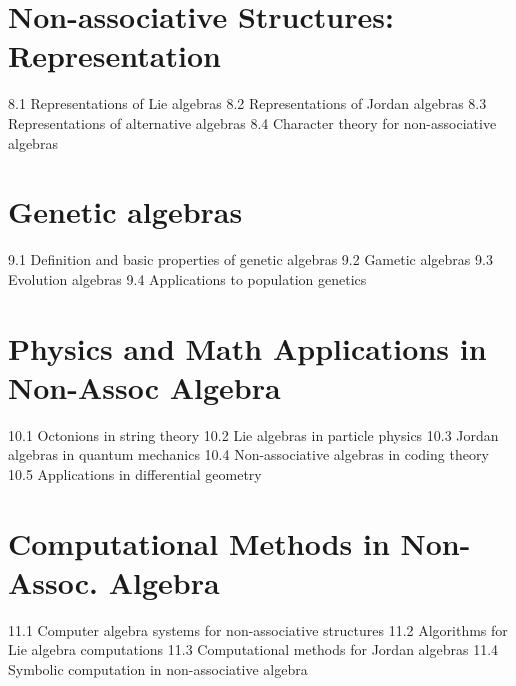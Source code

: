 \section{Non-associative Structures: Representation}
8.1 Representations of Lie algebras
8.2 Representations of Jordan algebras
8.3 Representations of alternative algebras
8.4 Character theory for non-associative algebras
\section{Genetic algebras}
9.1 Definition and basic properties of genetic algebras
9.2 Gametic algebras
9.3 Evolution algebras
9.4 Applications to population genetics
\section{Physics and Math Applications in Non-Assoc Algebra}
10.1 Octonions in string theory
10.2 Lie algebras in particle physics
10.3 Jordan algebras in quantum mechanics
10.4 Non-associative algebras in coding theory
10.5 Applications in differential geometry
\section{Computational Methods in Non-Assoc. Algebra}
11.1 Computer algebra systems for non-associative structures
11.2 Algorithms for Lie algebra computations
11.3 Computational methods for Jordan algebras
11.4 Symbolic computation in non-associative algebra

